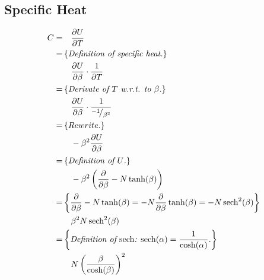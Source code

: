 \subsection{Specific Heat}
	\label{a:derivations:specificHeat}
	\begin{align*}
		\firstline{\specificHeat}{
			\frac{\partial \averageEnergy}{\partial \temperature}
		}
		\comment{
			\textit{Definition of specific heat.}
		}
		\content{
			\frac{\partial \averageEnergy}{\partial \beta} \cdot \frac{1}{\partial \temperature}
		}
		\comment{
			\textit{Derivate of \temperature w.r.t. to $\beta$.}
		}
		\content{
			\frac{\partial \averageEnergy}{\partial \beta} \cdot \frac{1}{\rfrac{-1}{\beta^2}}
		}
		\comment{
			Rewrite.
		}
		\content{
			- \beta^2 \frac{\partial \averageEnergy}{\partial \beta}
		}
		\comment{
			\textit{Definition of \averageEnergy.}
		}
		\content{
			- \beta^2 \left(\frac{\partial}{\partial \beta} -N \tanh (\beta)\right)
		}
		\comment{
			\frac{\partial}{\partial \beta} -N \tanh (\beta) = 
			-N \frac{\partial}{\partial \beta} \tanh (\beta) = 
			-N \sech^2(\beta)
		}
		\content{
			\beta^2 N \sech^2(\beta)
		}
		\comment{
			\textit{Definition of $\sech$: $\sech(\alpha) = \frac{1}{\cosh(\alpha)}$.}
		}
		\content{
			N \left(\frac{\beta}{\cosh(\beta)}\right)^2
		}
	\end{align*}		
